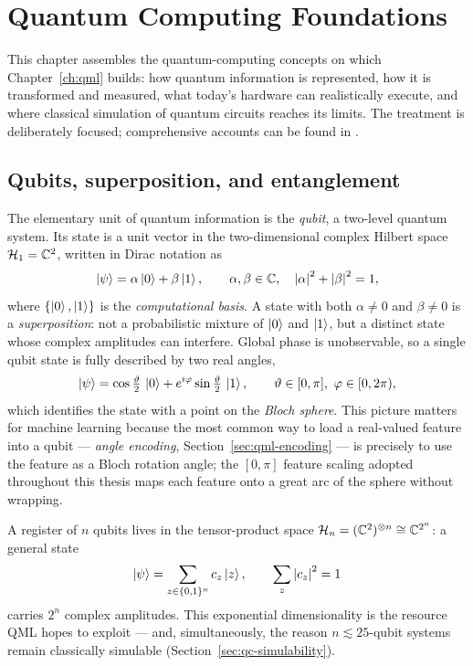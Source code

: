 \chapter{Quantum Computing Foundations}
\label{ch:quantum}

This chapter assembles the quantum-computing concepts on which
Chapter~\ref{ch:qml} builds: how quantum information is represented, how it is
transformed and measured, what today's hardware can realistically execute, and
where classical simulation of quantum circuits reaches its limits. The
treatment is deliberately focused; comprehensive accounts can be found in
\citet{nielsen2010quantum}.

\section{Qubits, superposition, and entanglement}
\label{sec:qc-qubits}

The elementary unit of quantum information is the \emph{qubit}, a two-level
quantum system. Its state is a unit vector in the two-dimensional complex
Hilbert space $\mathcal{H}_1 = \mathbb{C}^2$, written in Dirac notation as
\begin{equation}
  \left|\psi\right\rangle = \alpha \left|0\right\rangle + \beta \left|1\right\rangle,
  \qquad \alpha, \beta \in \mathbb{C}, \quad
  \left\lvert\alpha\right\rvert^2 + \left\lvert\beta\right\rvert^2 = 1,
  \label{eq:qubit}
\end{equation}
where $\{\left|0\right\rangle, \left|1\right\rangle\}$ is the \emph{computational basis}. A state with
both $\alpha \neq 0$ and $\beta \neq 0$ is a \emph{superposition}: not a
probabilistic mixture of $\left|0\right\rangle$ and $\left|1\right\rangle$, but a distinct state whose
complex amplitudes can interfere. Global phase is unobservable, so a single
qubit state is fully described by two real angles,
\begin{equation}
  \left|\psi\right\rangle = \cos\tfrac{\vartheta}{2}\,\left|0\right\rangle
             + e^{i\varphi} \sin\tfrac{\vartheta}{2}\,\left|1\right\rangle,
  \qquad \vartheta \in [0, \pi],\ \varphi \in [0, 2\pi),
\end{equation}
which identifies the state with a point on the \emph{Bloch sphere}. This
picture matters for machine learning because the most common way to load a
real-valued feature into a qubit --- \emph{angle encoding},
Section~\ref{sec:qml-encoding} --- is precisely to use the feature as a Bloch
rotation angle; the $[0,\pi]$ feature scaling adopted throughout this thesis
maps each feature onto a great arc of the sphere without wrapping.

A register of $n$ qubits lives in the tensor-product space
$\mathcal{H}_n = (\mathbb{C}^2)^{\otimes n} \cong \mathbb{C}^{2^n}$: a general state
\begin{equation}
  \left|\psi\right\rangle = \sum_{z \in \{0,1\}^n} c_z \left|z\right\rangle,
  \qquad \sum_z \left\lvert c_z\right\rvert^2 = 1
  \label{eq:nqubit}
\end{equation}
carries $2^n$ complex amplitudes. This exponential dimensionality is the
resource QML hopes to exploit --- and, simultaneously, the reason
$n \lesssim 25$-qubit systems remain classically simulable
(Section~\ref{sec:qc-simulability}).

